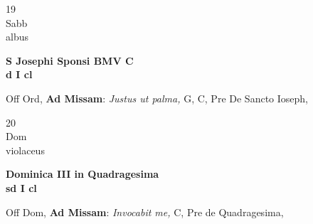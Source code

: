 \documentclass[10pt, openany]{book}
\begin{document}
        \begin{center}
            \begin{minipage}{3.5in}
                \vspace{2em}
                \begin{minipage}{0.5in}
                    {\Huge 19} \\
                    {\normalsize Sabb} \\
                    {\normalsize albus}
                \end{minipage}
                \begin{minipage}{3.0in}
                    \textbf{ \large S Josephi Sponsi BMV C \\
                    \textnormal{\normalsize d I cl}} \\ 
                \end{minipage}
                \begin{justify}Off Ord, \textbf{Ad Missam}: \textit{Justus ut palma,} G, C, Pre De Sancto Ioseph,  
                \end{justify}
            \end{minipage}
        \end{center}
    
        \begin{center}
            \begin{minipage}{3.5in}
                \vspace{2em}
                \begin{minipage}{0.5in}
                    {\Huge 20} \\
                    {\normalsize Dom} \\
                    {\normalsize violaceus}
                \end{minipage}
                \begin{minipage}{3.0in}
                    \textbf{ \large Dominica III in Quadragesima \\
                    \textnormal{\normalsize sd I cl}} \\ 
                \end{minipage}
                \begin{justify}Off Dom, \textbf{Ad Missam}: \textit{Invocabit me,} C, Pre de Quadragesima,  
                \end{justify}
            \end{minipage}
        \end{center}
    
\end{document}
